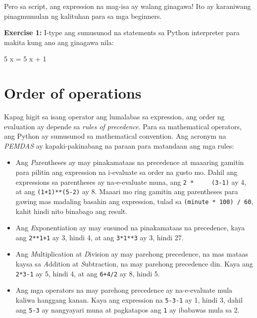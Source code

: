 \documentclass[10pt,]{book}
\newenvironment{Shaded}{}{}
\newcommand{\DecValTok}[1]{\textcolor[rgb]{0.25,0.63,0.44}{#1}}
\newcommand{\NormalTok}[1]{#1}
\newcommand{\OperatorTok}[1]{\textcolor[rgb]{0.40,0.40,0.40}{#1}}
\begin{document}
Pero sa script, ang expression na mag-isa ay walang ginagawa! Ito ay
karaniwang pinagmumulan ng kalituhan para sa mga beginners.

\textbf{Exercise 1:} I-type ang sumusunod na statements sa Python
interpreter para makita kung ano ang ginagawa nila:

\begin{Shaded}
\begin{Highlighting}[]
\DecValTok{5}
\NormalTok{x }\OperatorTok{=} \DecValTok{5}
\NormalTok{x }\OperatorTok{+} \DecValTok{1}
\end{Highlighting}
\end{Shaded}

\section{Order of operations}\label{order-of-operations}

  

Kapag higit sa isang operator ang lumalabas sa expression, ang order ng
evaluation ay depende sa \emph{rules of precedence}. Para sa
mathematical operators, ang Python ay sumusunod sa mathematical
convention. Ang acronym na \emph{PEMDAS} ay kapaki-pakinabang na paraan
para matandaan ang mga rules:


\begin{itemize}
\item
  Ang \emph{P}arentheses ay may pinakamataas na precedence at maaaring
  gamitin para pilitin ang expression na i-evaluate sa order na gusto
  mo. Dahil ang expressions sa parentheses ay na-e-evaluate muna, ang
  \texttt{2\ *\ \ \ \ \ (3-1)} ay 4, at ang \texttt{(1+1)**(5-2)} ay 8.
  Maaari mo ring gamitin ang parentheses para gawing mas madaling
  basahin ang expression, tulad sa \texttt{(minute\ *\ 100)\ /\ 60},
  kahit hindi nito binabago ang result.
\item
  Ang \emph{E}xponentiation ay may susunod na pinakamataas na
  precedence, kaya ang \texttt{2**1+1} ay 3, hindi 4, at ang
  \texttt{3*1**3} ay 3, hindi 27.
\item
  Ang \emph{M}ultiplication at \emph{D}ivision ay may parehong
  precedence, na mas mataas kaysa sa \emph{A}ddition at
  \emph{S}ubtraction, na may parehong precedence din. Kaya ang
  \texttt{2*3-1} ay 5, hindi 4, at ang \texttt{6+4/2} ay 8, hindi 5.
\item
  Ang mga operators na may parehong precedence ay na-e-evaluate mula
  kaliwa hanggang kanan. Kaya ang expression na \texttt{5-3-1} ay 1,
  hindi 3, dahil ang \texttt{5-3} ay nangyayari muna at pagkatapos ang
  \texttt{1} ay ibabawas mula sa 2.
\end{itemize}
\end{document}
